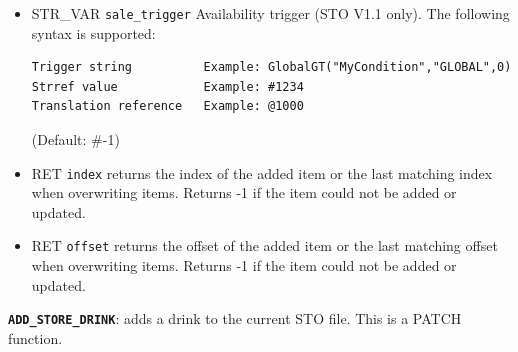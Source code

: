 \documentclass{article}
\def\DEFINE#1{{\tt \bf #1}\label{#1}\index{#1}}
\begin{document}
\begin{itemize}
\item STR_VAR \verb+sale_trigger+ Availability trigger (STO V1.1 only). The following syntax is supported:
\begin{verbatim}
Trigger string          Example: GlobalGT("MyCondition","GLOBAL",0)
Strref value            Example: #1234
Translation reference   Example: @1000
\end{verbatim}
(Default: #-1)
\item RET \verb+index+ returns the index of the added item or the last matching index when overwriting items. Returns -1 if the item could not be added or updated.
\item RET \verb+offset+ returns the offset of the added item or the last matching offset when overwriting items. Returns -1 if the item could not be added or updated.
\end{itemize}

\DEFINE{\verb+ADD_STORE_DRINK+}: adds a drink to the current STO file. This is a PATCH function.
\end{document}
